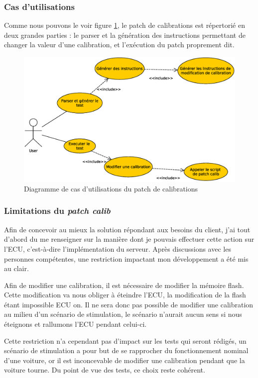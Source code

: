 		\subsubsection{Cas d'utilisations}
		Comme nous pouvons le voir figure \ref{fig:patch-cal-usecase}, le patch de calibrations est répertorié en deux grandes parties : le parser et la génération des instructions permettant de changer la valeur d'une calibration, et l'exécution du patch proprement dit.
		\begin{figure}[H]
			\centering
			\includegraphics[width=18cm]{contents/images/patch-cal_usecase.eps}
			\caption{Diagramme de cas d'utilisations du patch de calibrations}
			\label{fig:patch-cal-usecase}
		\end{figure}

		\subsubsection{Limitations du \textit{patch calib}}
		Afin de concevoir au mieux la solution répondant aux besoins du client, j'ai tout d'abord du me renseigner sur la manière dont je pouvais effectuer cette action sur l'ECU, c'est-à-dire l'implémentation du serveur. Après discussions avec les personnes compétentes, une restriction impactant mon développement a été mis au clair.
		
		Afin de modifier une calibration, il est nécessaire de modifier la mémoire flash. Cette modification va nous obliger à éteindre l'ECU, la modification de la flash étant impossible ECU on. Il ne sera donc pas possible de modifier une calibration au milieu d'un scénario de stimulation, le scénario n'aurait aucun sens si nous éteignons et rallumons l'ECU pendant celui-ci.
		
		Cette restriction n'a cependant pas d'impact sur les tests qui seront rédigés, un scénario de stimulation a pour but de se rapprocher du fonctionnement nominal d'une voiture, or il est inconcevable de modifier une calibration pendant que la voiture tourne. Du point de vue des tests, ce choix reste cohérent. 
		
